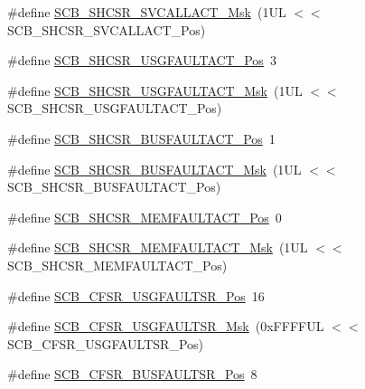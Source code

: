 \begin{DoxyCompactItemize}
\item 
\#define \mbox{\hyperlink{group___c_m_s_i_s___s_c_b_ga634c0f69a233475289023ae5cb158fdf}{S\+C\+B\+\_\+\+S\+H\+C\+S\+R\+\_\+\+S\+V\+C\+A\+L\+L\+A\+C\+T\+\_\+\+Msk}}~(1\+U\+L $<$$<$ S\+C\+B\+\_\+\+S\+H\+C\+S\+R\+\_\+\+S\+V\+C\+A\+L\+L\+A\+C\+T\+\_\+\+Pos)
\item 
\#define \mbox{\hyperlink{group___c_m_s_i_s___s_c_b_gae06f54f5081f01ed3f6824e451ad3656}{S\+C\+B\+\_\+\+S\+H\+C\+S\+R\+\_\+\+U\+S\+G\+F\+A\+U\+L\+T\+A\+C\+T\+\_\+\+Pos}}~3
\item 
\#define \mbox{\hyperlink{group___c_m_s_i_s___s_c_b_gab3166103b5a5f7931d0df90949c47dfe}{S\+C\+B\+\_\+\+S\+H\+C\+S\+R\+\_\+\+U\+S\+G\+F\+A\+U\+L\+T\+A\+C\+T\+\_\+\+Msk}}~(1\+U\+L $<$$<$ S\+C\+B\+\_\+\+S\+H\+C\+S\+R\+\_\+\+U\+S\+G\+F\+A\+U\+L\+T\+A\+C\+T\+\_\+\+Pos)
\item 
\#define \mbox{\hyperlink{group___c_m_s_i_s___s_c_b_gaf272760f2df9ecdd8a5fbbd65c0b767a}{S\+C\+B\+\_\+\+S\+H\+C\+S\+R\+\_\+\+B\+U\+S\+F\+A\+U\+L\+T\+A\+C\+T\+\_\+\+Pos}}~1
\item 
\#define \mbox{\hyperlink{group___c_m_s_i_s___s_c_b_ga9d7a8b1054b655ad08d85c3c535d4f73}{S\+C\+B\+\_\+\+S\+H\+C\+S\+R\+\_\+\+B\+U\+S\+F\+A\+U\+L\+T\+A\+C\+T\+\_\+\+Msk}}~(1\+U\+L $<$$<$ S\+C\+B\+\_\+\+S\+H\+C\+S\+R\+\_\+\+B\+U\+S\+F\+A\+U\+L\+T\+A\+C\+T\+\_\+\+Pos)
\item 
\#define \mbox{\hyperlink{group___c_m_s_i_s___s_c_b_ga7c856f79a75dcc1d1517b19a67691803}{S\+C\+B\+\_\+\+S\+H\+C\+S\+R\+\_\+\+M\+E\+M\+F\+A\+U\+L\+T\+A\+C\+T\+\_\+\+Pos}}~0
\item 
\#define \mbox{\hyperlink{group___c_m_s_i_s___s_c_b_ga9147fd4e1b12394ae26eadf900a023a3}{S\+C\+B\+\_\+\+S\+H\+C\+S\+R\+\_\+\+M\+E\+M\+F\+A\+U\+L\+T\+A\+C\+T\+\_\+\+Msk}}~(1\+U\+L $<$$<$ S\+C\+B\+\_\+\+S\+H\+C\+S\+R\+\_\+\+M\+E\+M\+F\+A\+U\+L\+T\+A\+C\+T\+\_\+\+Pos)
\item 
\#define \mbox{\hyperlink{group___c_m_s_i_s___s_c_b_gac8e4197b295c8560e68e2d71285c7879}{S\+C\+B\+\_\+\+C\+F\+S\+R\+\_\+\+U\+S\+G\+F\+A\+U\+L\+T\+S\+R\+\_\+\+Pos}}~16
\item 
\#define \mbox{\hyperlink{group___c_m_s_i_s___s_c_b_ga565807b1a3f31891f1f967d0fa30d03f}{S\+C\+B\+\_\+\+C\+F\+S\+R\+\_\+\+U\+S\+G\+F\+A\+U\+L\+T\+S\+R\+\_\+\+Msk}}~(0x\+F\+F\+F\+F\+U\+L $<$$<$ S\+C\+B\+\_\+\+C\+F\+S\+R\+\_\+\+U\+S\+G\+F\+A\+U\+L\+T\+S\+R\+\_\+\+Pos)
\item 
\#define \mbox{\hyperlink{group___c_m_s_i_s___s_c_b_ga555a24f4f57d199f91d1d1ab7c8c3c8a}{S\+C\+B\+\_\+\+C\+F\+S\+R\+\_\+\+B\+U\+S\+F\+A\+U\+L\+T\+S\+R\+\_\+\+Pos}}~8
$$
\end{DoxyCompactItemize}
